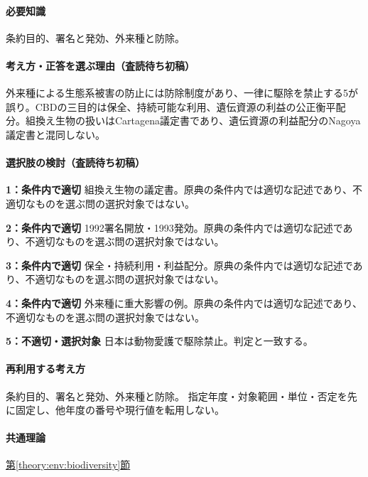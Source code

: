 \paragraph{必要知識} 条約目的、署名と発効、外来種と防除。

\paragraph{考え方・正答を選ぶ理由（査読待ち初稿）} 外来種による生態系被害の防止には防除制度があり、一律に駆除を禁止する5が誤り。CBDの三目的は保全、持続可能な利用、遺伝資源の利益の公正衡平配分。組換え生物の扱いはCartagena議定書であり、遺伝資源の利益配分のNagoya議定書と混同しない。

\paragraph{選択肢の検討（査読待ち初稿）}\mbox{}\par

\noindent\textbf{1：条件内で適切} 組換え生物の議定書。原典の条件内では適切な記述であり、不適切なものを選ぶ問の選択対象ではない。\par

\noindent\textbf{2：条件内で適切} 1992署名開放・1993発効。原典の条件内では適切な記述であり、不適切なものを選ぶ問の選択対象ではない。\par

\noindent\textbf{3：条件内で適切} 保全・持続利用・利益配分。原典の条件内では適切な記述であり、不適切なものを選ぶ問の選択対象ではない。\par

\noindent\textbf{4：条件内で適切} 外来種に重大影響の例。原典の条件内では適切な記述であり、不適切なものを選ぶ問の選択対象ではない。\par

\noindent\textbf{5：不適切・選択対象} 日本は動物愛護で駆除禁止。判定と一致する。\par

\paragraph{再利用する考え方} 条約目的、署名と発効、外来種と防除。 指定年度・対象範囲・単位・否定を先に固定し、他年度の番号や現行値を転用しない。

\paragraph{共通理論} \hyperref[theory:env:biodiversity]{第\ref*{theory:env:biodiversity}節}

